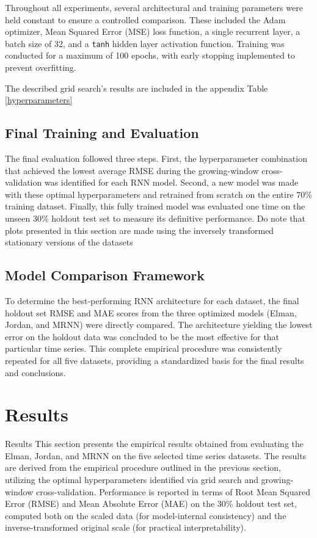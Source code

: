 \documentclass[conference, 10pt]{IEEEtran}
\begin{document}
Throughout all experiments, several architectural and training parameters were held constant to ensure a controlled
comparison. These included the Adam optimizer, Mean Squared Error (MSE) loss function, a single recurrent layer, a batch
size of 32, and a \texttt{tanh} hidden layer activation function. Training was conducted for a maximum of 100 epochs,
with early stopping implemented to prevent overfitting.

The described grid search's results are included in the appendix Table \ref{hyperparameters}

\subsection{Final Training and Evaluation}

The final evaluation followed three steps. First, the hyperparameter combination that achieved the lowest average RMSE
during the growing-window cross-validation was identified for each RNN model. Second, a new model was made with these
optimal hyperparameters and retrained from scratch on the entire 70\% training dataset. Finally, this fully trained
model was evaluated one time on the unseen 30\% holdout test set to measure its definitive performance. Do note that
plots presented in this section are made using the inversely transformed stationary versions of the datasets

\subsection{Model Comparison Framework}
To determine the best-performing RNN architecture for each dataset, the final holdout set RMSE and MAE scores from the
three optimized models (Elman, Jordan, and MRNN) were directly compared. The architecture yielding the lowest error
on the holdout data was concluded to be the most effective for that particular time series. This complete empirical
procedure was consistently repeated for all five datasets, providing a standardized basis for the final results and
conclusions.

\section{Results}
Results This section presents the empirical results obtained from evaluating the Elman, Jordan, and MRNN on the five
selected time series datasets. The results are derived from the empirical procedure outlined in the previous section,
utilizing the optimal hyperparameters identified via grid search and growing-window cross-validation. Performance is
reported in terms of Root Mean Squared Error (RMSE) and Mean Absolute Error (MAE) on the 30\% holdout test set, computed
both on the scaled data (for model-internal consistency) and the inverse-transformed original scale (for practical
interpretability).
\end{document}
